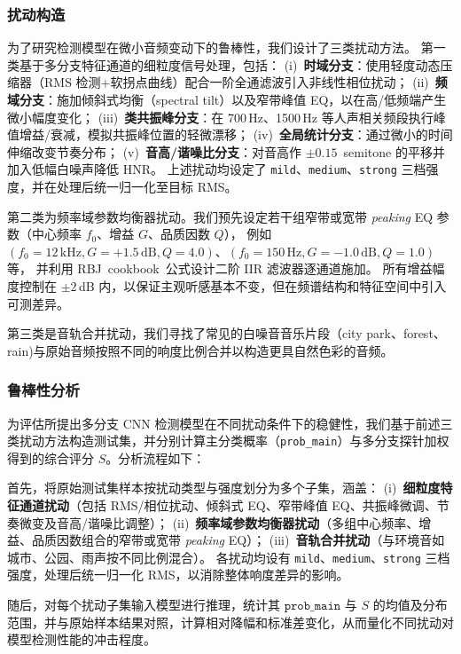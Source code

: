 \documentclass[a4paper,12pt]{article}
\begin{document}
\subsubsection{扰动构造}
为了研究检测模型在微小音频变动下的鲁棒性，我们设计了三类扰动方法。
第一类基于多分支特征通道的细粒度信号处理，包括：
(i)~\textbf{时域分支}：使用轻度动态压缩器（RMS 检测+软拐点曲线）配合一阶全通滤波引入非线性相位扰动；
(ii)~\textbf{频域分支}：施加倾斜式均衡（spectral tilt）以及窄带峰值 EQ，以在高/低频端产生微小幅度变化；
(iii)~\textbf{类共振峰分支}：在 700\,Hz、1500\,Hz 等人声相关频段执行峰值增益/衰减，模拟共振峰位置的轻微漂移；
(iv)~\textbf{全局统计分支}：通过微小的时间伸缩改变节奏分布；
(v)~\textbf{音高/谐噪比分支}：对音高作 $\pm 0.15$~semitone 的平移并加入低幅白噪声降低 HNR。
上述扰动均设定了 \texttt{mild}、\texttt{medium}、\texttt{strong} 三档强度，并在处理后统一归一化至目标 RMS。

第二类为频率域参数均衡器扰动。我们预先设定若干组窄带或宽带 \emph{peaking} EQ 参数（中心频率 $f_0$、增益 $G$、品质因数 $Q$），
例如 $(f_0=12\,\text{kHz}, G=+1.5\,\text{dB}, Q=4.0)$、$(f_0=150\,\text{Hz}, G=-1.0\,\text{dB}, Q=1.0)$ 等，
并利用 RBJ~cookbook~公式设计二阶 IIR 滤波器逐通道施加。
所有增益幅度控制在 $\pm 2$\,dB 内，以保证主观听感基本不变，但在频谱结构和特征空间中引入可测差异。


第三类是音轨合并扰动，我们寻找了常见的白噪音音乐片段（city park、forest、rain)与原始音频按照不同的响度比例合并以构造更具自然色彩的音频。



\subsubsection{鲁棒性分析}
为评估所提出多分支 CNN 检测模型在不同扰动条件下的稳健性，我们基于前述三类扰动方法构造测试集，并分别计算主分类概率（\texttt{prob\_main}）与多分支探针加权得到的综合评分 $S$。分析流程如下：

首先，将原始测试集样本按扰动类型与强度划分为多个子集，涵盖：
(i)~\textbf{细粒度特征通道扰动}（包括 RMS/相位扰动、倾斜式 EQ、窄带峰值 EQ、共振峰微调、节奏微变及音高/谐噪比调整）；
(ii)~\textbf{频率域参数均衡器扰动}（多组中心频率、增益、品质因数组合的窄带或宽带 \emph{peaking} EQ）；
(iii)~\textbf{音轨合并扰动}（与环境音如城市、公园、雨声按不同比例混合）。
各扰动均设有 \texttt{mild}、\texttt{medium}、\texttt{strong} 三档强度，处理后统一归一化 RMS，以消除整体响度差异的影响。

随后，对每个扰动子集输入模型进行推理，统计其 $\texttt{prob\_main}$ 与 $S$ 的均值及分布范围，并与原始样本结果对照，计算相对降幅和标准差变化，从而量化不同扰动对模型检测性能的冲击程度。
\end{document}
